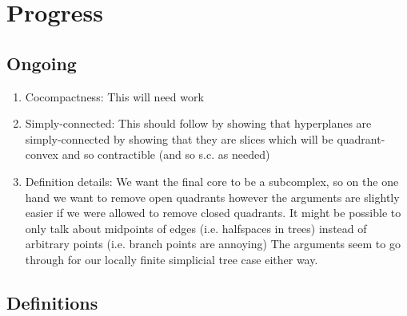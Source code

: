 \documentclass{article}
\theoremstyle{mystyle}
\theoremstyle{remark}
\begin{document}
\section{Progress}
\subsection{Ongoing}
\begin{enumerate}
    \item Cocompactness: This will need work
    \item Simply-connected: This should follow by showing that hyperplanes are simply-connected by showing that they are slices which will be quadrant-convex and so contractible (and so s.c. as needed)
    \item Definition details: We want the final core to be a subcomplex, so on the one hand we want to remove open quadrants however the arguments are slightly easier if we were allowed to remove closed quadrants. It might be possible to only talk about midpoints of edges (i.e. halfspaces in trees) instead of arbitrary points (i.e. branch points are annoying) The arguments seem to go through for our locally finite simplicial tree case either way. 
\end{enumerate}

\subsection{Definitions}
\end{document}
